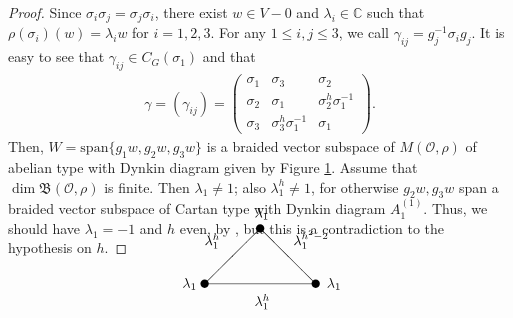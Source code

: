 \documentclass[11pt]{amsart} \textheight 22cm
\renewcommand{\^}[1]{\mbox{$^{\left( #1 \right)}$}}
\renewcommand{\_}[1]{\mbox{$_{\left( #1 \right)}$}}
\newcommand\toba{{\mathfrak B }}
\newcommand{\ku}{\mathbb C}
\newcommand{\Oc}{{\mathcal O}}
\newcommand{\oc}{{\mathcal O}}
\theoremstyle{plain}
\theoremstyle{definition}
\theoremstyle{remark}
\def\pf{\begin{proof}}
\def\epf{\end{proof}}
\theoremstyle{remark}
\begin{document}
\pf Since $\sigma_i\sigma_j=\sigma_j\sigma_i$, there exist $w\in
V-0$ and $\lambda_i\in\ku$ such that
$\rho(\sigma_i)(w)=\lambda_{i}w$ for $i=1,2,3$. For any $1\leq
i,j\leq3$, we call $\gamma_{ij}=g_{j}^{-1}\sigma_i g_{j}$. It is
easy to see that $\gamma_{ij}\in C_{G}(\sigma_1)$ and that
\begin{align*}
\gamma=(\gamma_{ij})=\left(\begin{array}{ccc}
    \sigma_{1} & \sigma_{3} & \sigma_{2}\\
    \sigma_{2} & \sigma_{1} & \sigma_{2}^{h}\sigma_{1}^{-1}\\
    \sigma_{3} & \sigma_{3}^{h}\sigma_{1}^{-1} & \sigma_{1}\end{array}\right).
\end{align*}
Then, $W=\text{span}\{g_{1} w,g_{2} w,g_{3} w\}$ is a braided
vector subspace of $M(\Oc,\rho)$ of abelian type with Dynkin
diagram given by Figure \ref{fi:triangulito}. Assume that
$\dim\toba(\oc,\rho)$ is finite. Then $\lambda_1\neq 1$; also
$\lambda_1^h\neq 1$, for otherwise $g_{2} w,g_{3} w$ span a
braided vector subspace of Cartan type with Dynkin diagram
$A_1^{(1)}$. Thus, we should have $\lambda_{1}=-1$ and $h$ even,
by \cite[Table 2]{H1}, but this is a contradiction to the
hypothesis on $h$. \epf

\begin{figure}[ht]
    \vspace{1cm}
    \begin{align*}%
        \setlength{\unitlength}{1.4cm}
        \begin{picture}(1,0)
            \put(0,0){\circle*{.15}} \put(1,1){\circle*{.15}}
            \put(2,0){\circle*{.15}} \put(0,0){\line(1,1){1}}
            \put(0,0){\line(2,0){2}} \put(1,1){\line(1,-1){1}}
            \put(0,.7){$\lambda_1^{h}$}
            \put(1.6,.7){$\lambda_1^{h^2-2}$} \put(0.9,-0.4){$\lambda_1^{h}$}
            \put(-0.4,-0.07){$\lambda_1$} \put(2.2,-0.07){$\lambda_1$}
            \put(0.9,1.2){$\lambda_1$}
        \end{picture}\qquad \qquad
    \end{align*}
\caption{}\label{fi:triangulito}
\end{figure}
\end{document}
